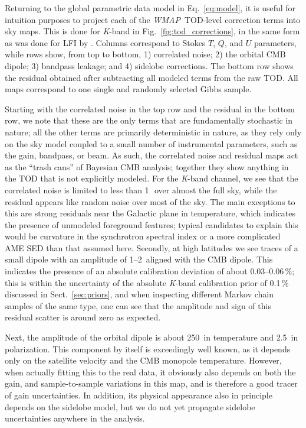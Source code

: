 \documentclass[twocolumn]{../../common/aa}
\def\WMAP{\emph{WMAP}}
\newcommand{\K}[0]{\textit K}
\begin{document}
Returning to the global parametric data model in Eq.~\eqref{eq:model}, it is useful for intuition purposes to project each of the \WMAP\ TOD-level correction terms into sky maps. This is done for \K-band in Fig.~\ref{fig:tod_corrections}, in the same form as was done for LFI by \citet{bp10}. Columns correspond to Stokes $T$, $Q$, and $U$ parameters, while rows show, from top to bottom, 1) correlated noise; 2) the orbital CMB dipole; 3) bandpass leakage; and 4) sidelobe corrections. The bottom row shows the residual obtained after subtracting all modeled terms from the raw TOD. All maps correspond to one single and randomly selected Gibbs sample.


Starting with the correlated noise in the top row and the residual in the bottom row, we note that these are the only terms that are fundamentally stochastic in nature; all the other terms are primarily deterministic in nature, as they rely only on the sky model coupled to a small number of instrumental parameters, such as the gain, bandpass, or beam. As such, the correlated noise and residual maps act as the ``trash cans'' of Bayesian CMB analysis; together they show anything in the TOD that is not explicitly modeled. For the \K-band channel, we see that the correlated noise is limited to less than 1\,\muK\ over almost the full sky, while the residual appears like random noise over most of the sky. The main exceptions to this are strong residuals near the Galactic plane in temperature, which indicates the presence of unmodeled foreground features; typical candidates to explain this would be curvature in the synchrotron spectral index or a more complicated AME SED than that assumed here. Secondly, at high latitudes we see traces of a small dipole with an amplitude of 1--2\muK\ aligned with the CMB dipole. This indicates the presence of an absolute calibration deviation of about 0.03--0.06\,\%; this is within the uncertainty of the absolute \K-band calibration prior of 0.1\,\% discussed in Sect.~\ref{sec:priors}, and when inspecting different Markov chain samples of the same type, one can see that the amplitude and sign of this residual scatter is around zero as expected.


Next, the amplitude of the orbital dipole is about 250\muK\ in temperature and 2.5\muK\ in polarization. This component by itself is exceedingly well known, as it depends only on the satellite velocity and the CMB monopole temperature. However, when actually fitting this to the real data, it obviously also depends on both the gain, and sample-to-sample variations in this map, and  is therefore a good tracer of gain uncertainties. In addition, its physical appearance also in principle depends on the sidelobe model, but we do not yet propagate sidelobe uncertainties anywhere in the analysis.
\end{document}

